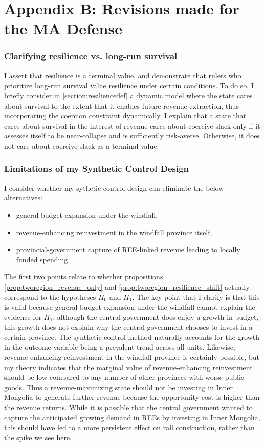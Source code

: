 \documentclass[12pt]{article}
\begin{document}
\section{Appendix B: Revisions made for the MA Defense}

\subsubsection{Clarifying resilience vs. long-run survival}

I assert that resilience is a terminal value, and demonstrate that rulers who prioritize long-run survival value resilience under certain conditions. To do so, I briefly consider in \ref{section:resiliencedef} a dynamic model where the state cares about survival to the extent that it enables future revenue extraction, thus incorporating the coercion constraint dynamically. I explain that a state that cares about survival in the interest of revenue cares about coercive slack only if it assesses itself to be near-collapse and is sufficiently risk-averse. Otherwise, it does not care about coercive slack as a terminal value.

\subsubsection{Limitations of my Synthetic Control Design}

I consider whether my sythetic control design can eliminate the below alternatives:
\begin{itemize}
    \item general budget expansion under the windfall,
    \item revenue-enhancing reinvestment in the windfall province itself,
    \item provincial-government capture of REE-linked revenue leading to locally funded spending.
\end{itemize}

The first two points relate to whether propositions \ref{prop:tworegion_revenue_only} and \ref{prop:tworegion_resilience_shift} actually correspond to the hypotheses $H_0$ and $H_1$. The key point that I clarify is that this is valid because general budget expansion under the windfall cannot explain the evidence for $H_1$: although the central government does enjoy a growth in budget, this growth does not explain why the central government chooses to invest in a certain province. The synthetic control method naturally accounts for the growth in the outcome variable being a prevalent trend across all units. Likewise, revenue-enhancing reinvestment in the windfall province is certainly possible, but my theory indicates that the marginal value of revenue-enhancing reinvestment should be low compared to any number of other provinces with worse public goods. Thus a revenue-maximizing state should not be investing in Inner Mongolia to generate further revenue because the opportunity cost is higher than the revenue returns. While it is possible that the central government wanted to capture the anticipated growing demand in REEs by investing in Inner Mongolia, this should have led to a more persistent effect on rail construction, rather than the spike we see here.
\end{document}

